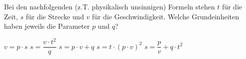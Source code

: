 Bei den nachfolgenden (z.T. physikalisch unsinnigen) Formeln stehen $t$ für die Zeit, $s$ für die Strecke und $v$ für die Geschwindigkeit. Welche Grundeinheiten haben jeweils die Parameter $p$ und $q$?

\begin{abcliste}
\abc $v = p\cdot s$
\abc $s = \dfrac{v\cdot t^2}{q}$
\abc $s = p\cdot v + q$
\abc $s = t\cdot\left(p\cdot v\right)^2$
\abc $s = \dfrac{p}{v} + q\cdot t^2$
\end{abcliste}
